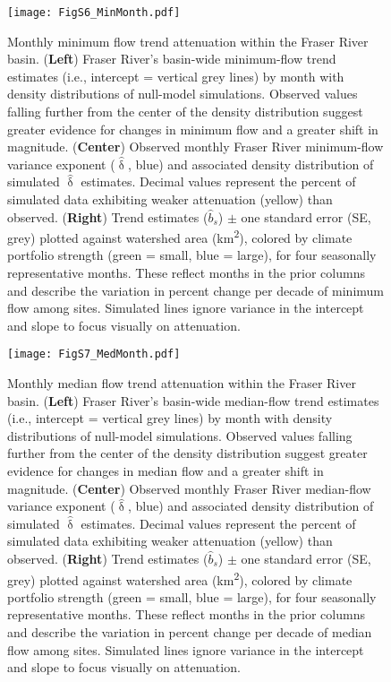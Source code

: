 \documentclass[grl]{agutexSI}
\begin{document}
\begin{figure}[h]
	\centering
	\noindent\texttt{[image: FigS6\_MinMonth.pdf]}
	\caption{Monthly minimum flow trend attenuation within the Fraser River basin. (\textbf{Left}) Fraser River's basin-wide minimum-flow trend estimates (i.e., intercept = vertical grey lines) by month with density distributions of null-model simulations. Observed values falling further from the center of the density distribution suggest greater evidence for changes in minimum flow and a greater shift in magnitude. (\textbf{Center}) Observed monthly Fraser River minimum-flow variance exponent ($\hat{\updelta}$, blue) and associated density distribution of simulated $\hat{\updelta}$ estimates. Decimal values represent the percent of simulated data exhibiting weaker attenuation (yellow) than observed. (\textbf{Right}) Trend estimates ($\hat{b}_{s}$) $\pm$ one standard error (SE, grey) plotted against watershed area (km\textsuperscript{2}), colored by climate portfolio strength (green = small, blue = large), for four seasonally representative months. These reflect months in the prior columns and describe the variation in percent change per decade of minimum flow among sites. Simulated lines ignore variance in the intercept and slope to focus visually on attenuation.}
	\label{fig:S6}
\end{figure}

\begin{figure}[h]
	\centering
	\noindent\texttt{[image: FigS7\_MedMonth.pdf]}
	\caption{Monthly median flow trend attenuation within the Fraser River basin. (\textbf{Left}) Fraser River's basin-wide median-flow trend estimates (i.e., intercept = vertical grey lines) by month with density distributions of null-model simulations. Observed values falling further from the center of the density distribution suggest greater evidence for changes in median flow and a greater shift in magnitude. (\textbf{Center}) Observed monthly Fraser River median-flow variance exponent ($\hat{\updelta}$, blue) and associated density distribution of simulated $\hat{\updelta}$ estimates. Decimal values represent the percent of simulated data exhibiting weaker attenuation (yellow) than observed. (\textbf{Right}) Trend estimates ($\hat{b}_{s}$) $\pm$ one standard error (SE, grey) plotted against watershed area (km\textsuperscript{2}), colored by climate portfolio strength (green = small, blue = large), for four seasonally representative months. These reflect months in the prior columns and describe the variation in percent change per decade of median flow among sites. Simulated lines ignore variance in the intercept and slope to focus visually on attenuation.}
	\label{fig:S7}
\end{figure}
\end{document}
